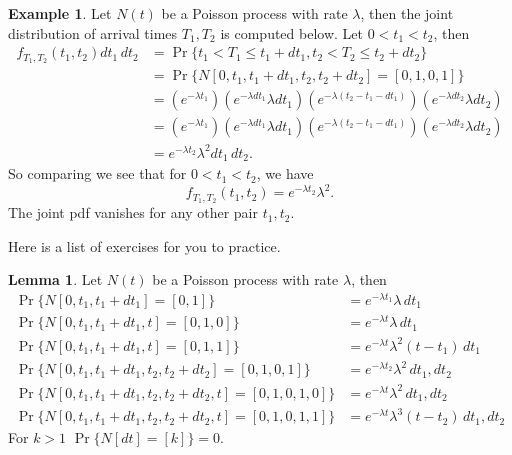 \documentclass[letterpaper, 12pt]{article}
\newcommand{\1}{\mathds{1}} %
\theoremstyle{definition}
\newtheorem{lemma}[theorem]{Lemma}
\newtheorem{example}[theorem]{Example}
\begin{document}
\begin{example}
Let $N(t)$ be a Poisson process with rate $\lambda$, then the joint distribution of arrival times $T_1, T_2$ is computed below. Let $0 < t_1 < t_2$, then
\begin{align*}
f_{T_1,T_2}(t_1,t_2)dt_1\,dt_2 &= \Pr\{t_1 < T_1 \leq t_1+dt_1,t_2 < T_2 \leq t_2+dt_2\}\\
                               &= \Pr\{N[0,t_1,t_1+dt_1,t_2,t_2+dt_2]=[0,1,0,1]\}\\
                               &= (e^{-\lambda t_1})(e^{-\lambda dt_1}\lambda dt_1)(e^{-\lambda (t_2-t_1-dt_1)})(e^{-\lambda dt_2}\lambda dt_2)\\
                               &= (e^{-\lambda t_1})(e^{-\lambda dt_1}\lambda dt_1)(e^{-\lambda (t_2-t_1-dt_1)})(e^{-\lambda dt_2}\lambda dt_2)\\
                               &= e^{-\lambda t_2} \lambda^2 dt_1 \, dt_2.
\end{align*}
So comparing we see that for $0 < t_1 < t_2$, we have \[f_{T_1,T_2}(t_1,t_2) = e^{-\lambda t_2} \lambda^2.\]The joint pdf vanishes for any other pair $t_1,t_2$.
\end{example}

Here is a list of exercises for you to practice.

\begin{lemma}
Let $N(t)$ be a Poisson process with rate $\lambda$, then 
\begin{align*}
\Pr\{ N[0,t_1,t_1+dt_1]=[0,1]\} &= e^{-\lambda t_1} \lambda \, dt_1\\
\Pr\{N[0,t_1,t_1+dt_1,t]=[0,1,0]\} &= e^{-\lambda t} \lambda \, dt_1\\
\Pr\{N[0,t_1,t_1+dt_1,t]=[0,1,1]\} &= e^{-\lambda t} \lambda^2 (t-t_1)\, dt_1\\
\Pr\{N[0,t_1,t_1+dt_1,t_2,t_2+dt_2]=[0,1,0,1]\} &= e^{-\lambda t_2} \lambda^2 \, dt_1,dt_2\\
\Pr\{N[0,t_1,t_1+dt_1,t_2,t_2+dt_2,t]=[0,1,0,1,0]\} &= e^{-\lambda t} \lambda^2 \, dt_1,dt_2\\
\Pr\{N[0,t_1,t_1+dt_1,t_2,t_2+dt_2,t]=[0,1,0,1,1]\} &= e^{-\lambda t} \lambda^3 (t-t_2) \, dt_1,dt_2
\end{align*}
For $k > 1$ $\Pr\{N[dt]=[k]\}=0$.  
\end{lemma}
\end{document}
